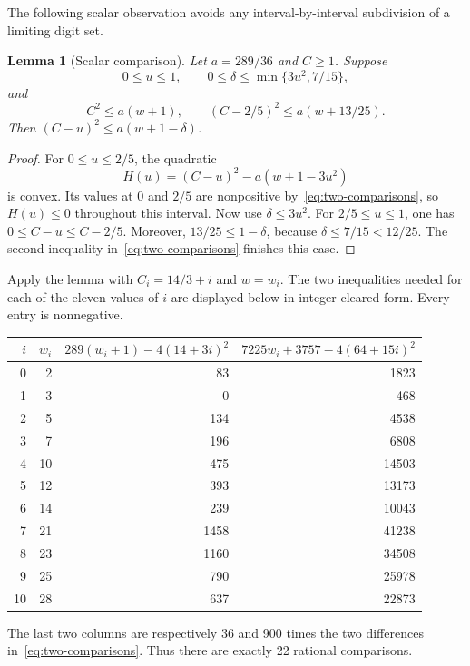 \documentclass[11pt]{article}
\newtheorem{lemma}[theorem]{Lemma}
\theoremstyle{definition}\newtheorem{definition}[theorem]{Definition}
\theoremstyle{remark}\newtheorem{remark}[theorem]{Remark}
\numberwithin{equation}{section}
\begin{document}
The following scalar observation avoids any interval-by-interval subdivision of a limiting digit set.
\begin{lemma}[Scalar comparison]\label{lem:scalar}
Let $a=289/36$ and $C\ge1$. Suppose
\[
0\le u\le1,\qquad 0\le\delta\le\min\{3u^2,7/15\},
\]
and
\begin{equation}\label{eq:two-comparisons}
C^2\le a(w+1),\qquad
(C-2/5)^2\le a(w+13/25).
\end{equation}
Then $(C-u)^2\le a(w+1-\delta)$.
\end{lemma}
\begin{proof}
For $0\le u\le2/5$, the quadratic
\[
H(u)=(C-u)^2-a(w+1-3u^2)
\]
is convex. Its values at 0 and $2/5$ are nonpositive by~\eqref{eq:two-comparisons}, so $H(u)\le0$ throughout this interval. Now use $\delta\le3u^2$. For $2/5\le u\le1$, one has $0\le C-u\le C-2/5$. Moreover,
$13/25\le1-\delta$, because $\delta\le7/15<12/25$. The second inequality in~\eqref{eq:two-comparisons} finishes this case.
\end{proof}

Apply the lemma with $C_i=14/3+i$ and $w=w_i$. The two inequalities needed for each of the eleven values of $i$ are displayed below in integer-cleared form. Every entry is nonnegative.
\begin{center}\small
\begin{tabular}{rrrr}
\toprule
$i$ & $w_i$ & $289(w_i+1)-4(14+3i)^2$ & $7225w_i+3757-4(64+15i)^2$\\
\midrule
0&2&83&1823\\
1&3&0&468\\
2&5&134&4538\\
3&7&196&6808\\
4&10&475&14503\\
5&12&393&13173\\
6&14&239&10043\\
7&21&1458&41238\\
8&23&1160&34508\\
9&25&790&25978\\
10&28&637&22873\\
\bottomrule
\end{tabular}
\end{center}
The last two columns are respectively 36 and 900 times the two differences in~\eqref{eq:two-comparisons}. Thus there are exactly 22 rational comparisons.
\end{document}
